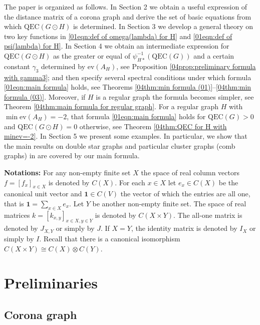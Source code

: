 \documentclass[12pt,a4paper]{article}
\newcommand{\1}{{\bm 1}}
\numberwithin{equation}{section}
\begin{document}
The paper is organized as follows.
In Section 2 we obtain a useful expression of the distance matrix
of a corona graph and derive the set of basic equations
from which $\mathrm{QEC}(G\odot H)$ is determined.
In Section 3 we develop a general theory on
two key functions in
\eqref{01eqn:def of omega(lambda) for H} and
\eqref{01eqn:def of psi(lambda) for H}.
In Section 4 we obtain an intermediate
expression for $\mathrm{QEC}(G\odot H)$ 
as the greater or equal of $\psi_{H*}^{-1}(\mathrm{QEC}(G))$
and a certain constant $\gamma_3$ determined by
$\mathrm{ev}(A_H)$,
see Proposition \ref{04prop:preliminary formula with gamma3};
and then specify several spectral conditions
under which formula \eqref{01eqn:main formula} holds,
see Theorems \ref{04thm:min formula (01)}--\ref{04thm:min formula (03)}.
Moreover, if $H$ is a regular graph
the formula becomes simpler,
see Theorem \ref{04thm:main formula for regular graph}.
For a regular graph $H$ with $\min\mathrm{ev}(A_H)=-2$,
that formula \eqref{01eqn:main formula} holds for $\mathrm{QEC}(G)>0$
and $\mathrm{QEC}(G\odot H)=0$ otherwise,
see Theorem \ref{04thm:QEC for H with minev=-2}.
In Section 5 we present some examples.
In particular, we show that the main results
on double star graphs and particular cluster graphs
(comb graphs) in \cite{Choudhury-Nandi2023}
are covered by our main formula.


\bigskip
{\bfseries Notations:}\enspace
For any non-empty finite set $X$ 
the space of real column vectors $f=[f_x]_{x\in X}$ is
denoted by $C(X)$.
For each $x\in X$ let $e_x\in C(X)$ be the canonical unit vector
and $\bm{1}\in C(V)$ the vector of which the entries are all one,
that is $\bm{1}=\sum_{x\in X} e_x$.
Let $Y$ be another non-empty finite set.
The space of real matrices
$k=[k_{x,y}]_{x\in X,y\in Y}$ is denoted by $C(X\times Y)$.
The all-one matrix is denoted by $J_{X,Y}$ or simply by $J$.
If $X=Y$, the identity matrix is denoted by $I_X$ or simply by $I$. 
Recall that there is a canonical isomorphism
$C(X\times Y)\cong C(X)\otimes C(Y)$.


\section{Preliminaries}
\label{01sec:Preliminaries}

\subsection{Corona graph}
\label{02subsec:Corona graph}
\end{document}
